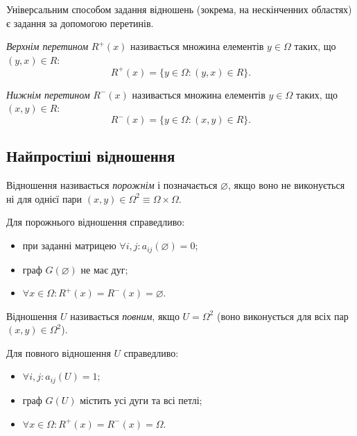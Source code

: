 Універсальним способом задання відношень (зокрема, на нескінченних областях) є задання за допомогою перетинів.

\begin{definition}
	\textit{Верхнім перетином} $R^+(x)$ називається множина елементів $y \in \Omega$ таких, що $(y, x) \in R$: \begin{equation}R^+(x) = \{y \in \Omega: (y, x) \in R\}.\end{equation}
\end{definition}

\begin{definition}
	\textit{Нижнім перетином} $R^-(x)$ називається множина елементів $y \in \Omega$ таких, що $(x, y) \in R$: \begin{equation}R^-(x) = \{y \in \Omega: (x, y) \in R\}.\end{equation}
\end{definition}

\subsection{Найпростіші відношення}

\begin{definition}
	Відношення називається \textit{порожнім} і позначається $\varnothing$, якщо воно не виконується ні для однієї пари $(x, y) \in \Omega^2 \equiv \Omega \times \Omega$.
\end{definition}

\begin{properties}
	Для порожнього відношення справедливо:
	\begin{itemize}
		\item при заданні матрицею $\forall i,j: a_{ij}(\varnothing) = 0$;
		\item граф $G(\varnothing)$ не має дуг;
		\item $\forall x \in \Omega: R^+(x) = R^-(x) = \varnothing$.
	\end{itemize}
\end{properties}

\begin{definition}
	Відношення $U$ називається \textit{повним}, якщо $U = \Omega^2$ (воно виконується для всіх пар $(x, y) \in \Omega^2$).
\end{definition}

\begin{properties}
	Для повного відношення $U$ справедливо:
	\begin{itemize}
		\item $\forall i, j: a_{ij}(U) = 1$;
		\item граф $G(U)$ містить усі дуги та всі петлі;
		\item $\forall x \in \Omega: R^+(x) = R^-(x) = \Omega$.
	\end{itemize}
\end{properties}

